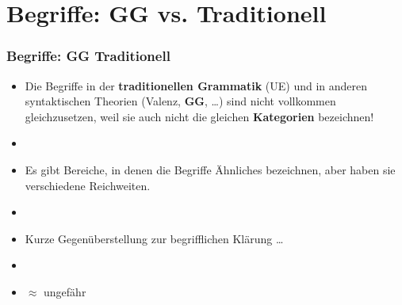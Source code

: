 \section{Begriffe: GG vs. Traditionell}


\begin{frame}
\frametitle{Begriffe: GG \vs Traditionell}

\begin{itemize}
	\item Die Begriffe in der \textbf{traditionellen Grammatik} (UE) und in anderen syntaktischen Theorien (Valenz, \textbf{GG}, \dots ) sind nicht vollkommen gleichzusetzen, weil sie auch nicht die gleichen \textbf{Kategorien} bezeichnen!
	\item[]
	\item Es gibt Bereiche, in denen die Begriffe Ähnliches bezeichnen, aber \idR  haben sie verschiedene Reichweiten.
	\item[]
	\item Kurze Gegenüberstellung zur begrifflichen Klärung \dots
	\item[]
	\item $\approx$ \ras ungefähr
\end{itemize}

\end{frame}


